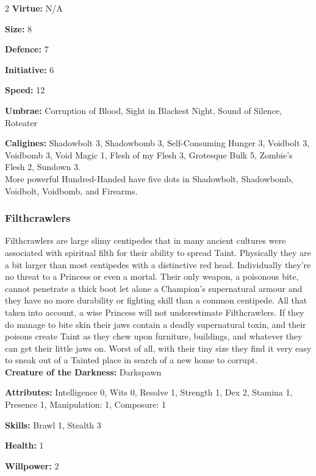 \begin{multicols}{2}
\noindent \textbf{Virtue:} N/A

\noindent \textbf{Size:} 8

\noindent \textbf{Defence:} 7

\noindent \textbf{Initiative:} 6

\noindent \textbf{Speed:} 12

\noindent \textbf{Umbrae:} Corruption of Blood, Sight in Blackest Night, Sound of Silence, Roteater

\noindent \textbf{Caligines:} Shadowbolt 3, Shadowbomb 3, Self-Consuming Hunger 3, Voidbolt 3, Voidbomb 3, Void Magic 1, Flesh of my Flesh 3, Grotesque Bulk 5, Zombie's Flesh 2, Sundown 3.\\

\noindent More powerful Hundred-Handed have five dots in Shadowbolt, Shadowbomb, Voidbolt, Voidbomb, and Firearms.

\subsubsection*{Filthcrawlers}

Filthcrawlers are large slimy centipedes that in many ancient cultures were associated with spiritual filth for their ability to spread Taint. Physically they are a bit larger than most centipedes with a distinctive red head. Individually they're no threat to a Princess or even a mortal. Their only weapon, a poisonous bite, cannot penetrate a thick boot let alone a Champion's supernatural armour and they have no more durability or fighting skill than a common centipede. All that taken into account, a wise Princess will not underestimate Filthcrawlers. If they do manage to bite skin their jaws contain a deadly supernatural toxin, and their poisons create Taint as they chew upon furniture, buildings, and whatever they can get their little jaws on. Worst of all, with their tiny size they find it very easy to sneak out of a Tainted place in search of a new home to corrupt. \\

\noindent \textbf{Creature of the Darkness:} Darkspawn

\noindent \textbf{Attributes:} Intelligence 0, Wits 0, Resolve 1, Strength 1, Dex 2, Stamina 1, Presence 1, Manipulation: 1, Composure: 1

\noindent \textbf{Skills:} Brawl 1, Stealth 3 

\noindent \textbf{Health:} 1

\noindent \textbf{Willpower:} 2


\end{multicols}
